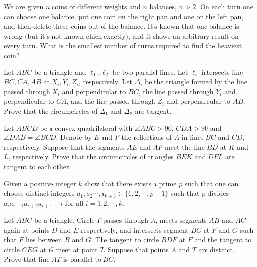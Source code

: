 \documentclass[11pt]{scrartcl}
\begin{document}
\begin{problem}[2211812924503059239]
	We are given $n$ coins of different weights and $n$ balances, $n>2$. On each turn one can choose one balance, put one coin on the right pan and one on the left pan, and then delete these coins out of the balance. It's known that one balance is wrong (but it's not known ehich exactly), and it shows an arbitrary result on every turn. What is the smallest number of turns required to find the heaviest coin?
\end{problem}
\begin{problem}[4992489807901310938]
Let $ABC$ be a triangle and $\ell_1,\ell_2$ be two parallel lines. Let $\ell_i$ intersects line $BC,CA,AB$ at $X_i,Y_i,Z_i$, respectively. Let $\Delta_i$ be the triangle formed by the line passed through $X_i$ and perpendicular to $BC$, the line passed through $Y_i$ and perpendicular to $CA$, and the line passed through $Z_i$ and perpendicular to $AB$. Prove that the circumcircles of $\Delta_1$ and $\Delta_2$ are tangent.
\end{problem}
\begin{problem}[728988632553727]
Let $ABCD$ be a convex quadrilateral with $\angle ABC>90$, $CDA>90$ and $\angle DAB=\angle BCD$. Denote by $E$ and $F$ the reflections of $A$ in lines $BC$ and $CD$, respectively. Suppose that the segments $AE$ and $AF$ meet the line $BD$ at $K$ and $L$, respectively. Prove that the circumcircles of triangles $BEK$ and $DFL$ are tangent to each other.
\end{problem}
\begin{problem}[961350373727093]
Given a positive integer $k$ show that there exists a prime $p$ such that one can choose distinct integers $a_1,a_2\cdots, a_{k+3} \in \{1, 2, \cdots ,p-1\}$ such that p divides $a_ia_{i+1}a_{i+2}a_{i+3}-i$ for all $i= 1, 2, \cdots, k$.
\end{problem}
\begin{problem}[797215984506934]
	Let $ABC$ be a triangle. Circle $\Gamma$ passes through $A$, meets segments $AB$ and $AC$ again at points $D$ and $E$ respectively, and intersects segment $BC$ at $F$ and $G$ such that $F$ lies between $B$ and $G$. The tangent to circle $BDF$ at $F$ and the tangent to circle $CEG$ at $G$ meet at point $T$. Suppose that points $A$ and $T$ are distinct. Prove that line $AT$ is parallel to $BC$.
\end{problem}
\end{document}
